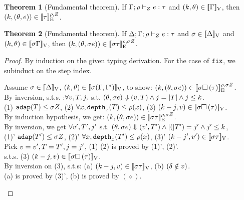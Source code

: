 \documentclass[a4paper,11pt]{article}
\theoremstyle{definition}
\newtheorem{thm}{Theorem}
\begin{document}
\begin{thm}[Fundamental theorem]
  If $\Gamma; \rho \vdash_{Z} e: \tau$ and $(k, \theta)
  \in [\![ \Gamma ]\!]_{\text{V}}$, then $(k, (\theta, e)) \in
  [\![ \tau ]\!]_{\text{E}}^{\rho, Z}$.
\end{thm}
{\color{red}
\begin{thm}[Fundamental theorem]
  If $\Delta; \Gamma; \rho \vdash_{Z} e: \tau$ and $ \sigma \in [\![ \Delta ]\!]_{\text{V}}$ and $(k, \theta)
  \in [\![ \sigma \Gamma ]\!]_{\text{V}}$, then $(k, (\theta, \sigma e)) \in
  [\![ \sigma \tau ]\!]_{\text{E}}^{\rho, \sigma Z}$.
\end{thm}%
}
\begin{proof}
By induction on the given typing derivation. For the case of
$\mathop{\mathtt{fix}}$, we subinduct on the step index.\\
\begin{mainitem} 
Assume $\sigma \in [\![ \Delta ]\!]_{\text{V}}$, $(k, \theta) \in [\![ \sigma (\Gamma, \Gamma') ]\!]_{\text{V}}$, to show: $(k, (\theta, \sigma e)) \in [\![ \sigma \mathtt{\square} \, (\tau) ]\!]_{\text{E}}^{\rho, \sigma Z}$.\\
%
By inversion, s.t.s. :$ \forall v, T, j, 
$ s.t. $ (\theta, \sigma e) \mathrel{\Downarrow} (v, T) \land j = |T| \land j \leq k $.  \\
(1) $\mathtt{adap}(T) \leq \sigma Z $, (2) $\forall x, \mathtt{depth}_{x}(T) \leq \rho(x)$, (3) $(k-j, v) \in [\![  \sigma \mathtt{\square} \, (\tau)  ]\!]_{\text{V}} $. \\
%
By induction hypothesis, we get: $(k, (\theta, \sigma e)) \in [\![ \sigma \tau ]\!]_{\text{E}}^{\rho, \sigma Z}$.\\
%
By inversion, we get $\forall v', T', j'$ s.t. $(\theta, \sigma e) \mathrel{\Downarrow} (v', T') \land |(|T') = j' \land j' \leq k$,\\
(1)' $\mathtt{adap}(T') \leq \sigma Z$, (2)' $\forall x, \mathtt{depth}_{x}(T') \leq \rho(x)$, (3)' $(k - j', v') \in [\![ \sigma \tau ]\!]_{\text{V}}$.\\
%
Pick $v = v', T = T' , j = j'$, (1) (2) is proved by (1)', (2)'.\\
%
s.t.s. (3) $(k - j, v ) \in [\![ \sigma \mathtt{\square} \, (\tau) ]\!]_{\text{V}}$.\\
%
By inversion on (3), s.t.s: (a) $(k - j, v) \in [\![ \sigma \tau ]\!]_{\text{V}}$, (b) $(\delta \notin v)$.\\
(a) is proved by (3)', (b) is proved by $(\diamond)$.
\\


\end{mainitem}
\end{proof}
\end{document}
